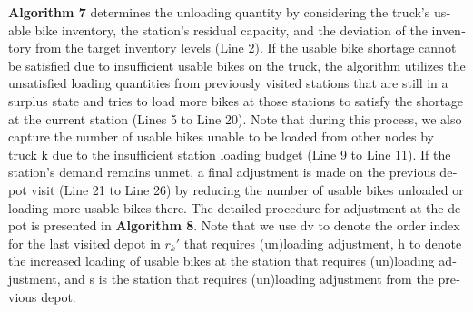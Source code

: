\documentclass[
  english,
]{article}
\begin{document}
\begin{otherlanguage}{english}
\textbf{Algorithm 7} determines the unloading quantity by considering the truck's usable bike
inventory, the station's residual capacity, and the deviation of the inventory from the target
inventory levels (Line 2). If the usable bike shortage cannot be satisfied due to insufficient
usable bikes on the truck, the algorithm utilizes the unsatisfied loading quantities from previously
visited stations that are still in a surplus state and tries to load more bikes at those stations to
satisfy the shortage at the current station (Lines 5 to Line 20). Note that during this process, we
also capture the number of usable bikes unable to be loaded from other nodes by truck k due to the
insufficient station loading budget (Line 9 to Line 11). If the station's demand remains unmet, a
final adjustment is made on the previous depot visit (Line 21 to Line 26) by reducing the number of
usable bikes unloaded or loading more usable bikes there. The detailed procedure for adjustment at
the depot is presented in \textbf{Algorithm 8}. Note that we use dv to denote the order index for
the last visited depot in \(r_{k}'\) that requires (un)loading adjustment, h to denote the increased
loading of usable bikes at the station that requires (un)loading adjustment, and s is the station
that requires (un)loading adjustment from the previous depot.


\end{otherlanguage}
\end{document}
